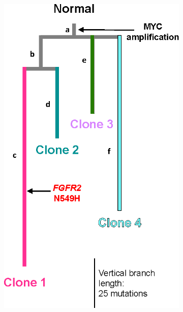 \begin{figure}[htbp]
	\centering
	\begin{subfigure}{0.4\textwidth}
		\includegraphics[width=\textwidth,keepaspectratio]{images/240/canopy_tree}
		\caption{}\label{fig:240:canopy_tree}
	\end{subfigure}%
	\hfill%
	\begin{subfigure}{0.55\textwidth}

\end{subfigure}
\end{figure}
